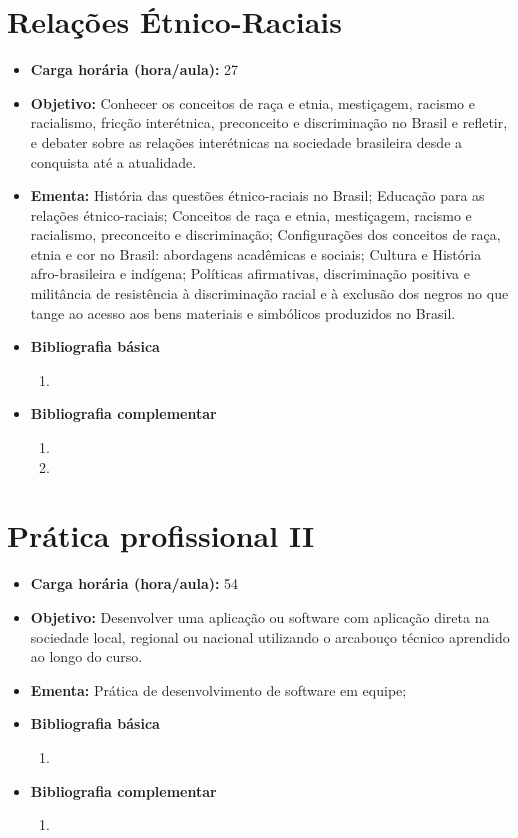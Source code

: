 \documentclass[
	10pt,				%
	openright,			%
	twoside,			%
	a4paper,			%
	english,			%
	french,				%
	brazil,				%
	sumario=tradicional
]{abntex2}
\begin{document}
\section*{Relações Étnico-Raciais}\label{4_etnicoraciais}
\begin{itemize}
	\item \textbf{Carga horária (hora/aula):} 27
	\item \textbf{Objetivo:} Conhecer os conceitos de raça e etnia, mestiçagem, racismo e racialismo, fricção interétnica, preconceito e discriminação no Brasil e refletir, e debater sobre as relações interétnicas na sociedade brasileira desde a conquista até a atualidade.
	\item \textbf{Ementa:} 
	História das questões étnico-raciais no Brasil;
	Educação para as relações étnico-raciais;
	Conceitos de raça e etnia, mestiçagem, racismo e racialismo, preconceito e discriminação;
	Configurações dos conceitos de raça, etnia e cor no Brasil: abordagens acadêmicas e sociais;
	Cultura e História afro-brasileira e indígena;
	Políticas afirmativas, discriminação positiva e militância de resistência à discriminação racial e à exclusão dos negros no que tange ao acesso aos bens materiais e simbólicos produzidos no Brasil.
	\item \textbf{Bibliografia básica}
	\begin{enumerate}
		\item 
	\end{enumerate}
	\item \textbf{Bibliografia complementar}
	\begin{enumerate}
		\item
		\item 
	\end{enumerate}
\end{itemize}

\newpage
\section*{Prática profissional II}\label{4_projsoc}
\begin{itemize}
	\item \textbf{Carga horária (hora/aula):} 54
	\item \textbf{Objetivo:} Desenvolver uma aplicação ou software com aplicação direta na sociedade local, regional ou nacional utilizando o arcabouço técnico aprendido ao longo do curso.
	\item \textbf{Ementa:} 
	Prática de desenvolvimento de software em equipe;
	\item \textbf{Bibliografia básica}
	\begin{enumerate}
		\item 
	\end{enumerate}
	\item \textbf{Bibliografia complementar}
	\begin{enumerate}
		\item 	
	\end{enumerate}	
\end{itemize}
\end{document}
